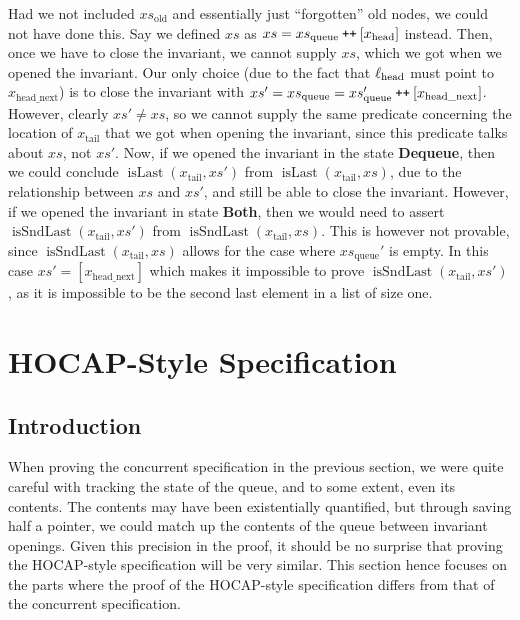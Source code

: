 \documentclass[a4paper, 10pt]{report}
\theoremstyle{definition}
\newcommand{\xsc}{xs}
\newcommand{\xsqueue}{xs_{\mathrm{queue}}}
\newcommand{\xsold}{xs_{\mathrm{old}}}
\newcommand{\isLast}{\operatorname{isLast}}
\newcommand{\isSndLast}{\operatorname{isSndLast}}
\newcommand{\locN}[1]{\loc_{\mathrm{#1}}}
\newcommand{\lochead}{\locN{head}}
\newcommand{\node}{x}
\newcommand{\nodeN}[1]{\node_{\mathrm{#1}}}
\newcommand{\nodehead}{\nodeN{head}}
\newcommand{\nodetail}{\nodeN{tail}}
\newcommand{\nodeheadnext}{\nodeN{head\_next}}
\newcommand{\DequeueState}{\textbf{Dequeue}\xspace}
\newcommand{\BothState}{\textbf{Both}\xspace}
\newcommand\catenate{\mathbin{\text{\ttfamily\upshape ++}}}
\begin{document}
Had we not included $\xsold$ and essentially just ``forgotten'' old nodes, we could not have done this. Say we defined $\xsc$ as $\xsc = \xsqueue \catenate [\nodehead]$ instead. Then, once we have to close the invariant, we cannot supply $\xsc$, which we got when we opened the invariant. Our only choice (due to the fact that $\lochead$ must point to $\nodeheadnext$) is to close the invariant with $\xsc' = \xsqueue = \xsqueue' \catenate [\nodeheadnext]$. However, clearly $\xsc' \neq \xsc$, so we cannot supply the same predicate concerning the location of $\nodetail$ that we got when opening the invariant, since this predicate talks about $\xsc$, not $\xsc'$. Now, if we opened the invariant in the state \DequeueState, then we could conclude $\isLast(\nodetail, \xsc')$ from $\isLast(\nodetail, \xsc)$, due to the relationship between $\xsc$ and $\xsc'$, and still be able to close the invariant. However, if we opened the invariant in state \BothState, then we would need to assert $\isSndLast(\nodetail, \xsc')$ from $\isSndLast(\nodetail, \xsc)$. This is however not provable, since $\isSndLast(\nodetail, \xsc)$ allows for the case where $\xsqueue'$ is empty. In this case $\xsc' = [\nodeheadnext]$ which makes it impossible to prove $\isSndLast(\nodetail, \xsc')$, as it is impossible to be the second last element in a list of size one.

\section{HOCAP-Style Specification}
\label{TLMSQSPECS:section:hocap}

\subsection{Introduction}
When proving the concurrent specification in the previous section, we were quite careful with tracking the state of the queue, and to some extent, even its contents. The contents may have been existentially quantified, but through saving half a pointer, we could match up the contents of the queue between invariant openings. Given this precision in the proof, it should be no surprise that proving the HOCAP-style specification will be very similar. This section hence focuses on the parts where the proof of the HOCAP-style specification differs from that of the concurrent specification.
\end{document}
